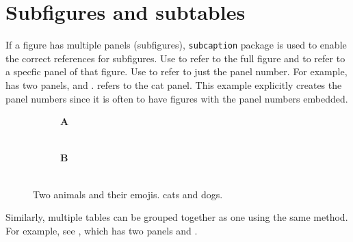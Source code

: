 \section{Subfigures and subtables}
If a figure has multiple panels (subfigures), \texttt{subcaption} package is used to enable the correct references for subfigures.
Use \cmd{\fref} to refer to the full figure and \cmd{\fref} to refer to a specfic panel of that figure.
Use \cmd{\subcaptionref} to refer to just the panel number.
For example,  has two panels,  and .
 refers to the cat panel.
This example explicitly creates the panel numbers since it is often to have figures with the panel numbers embedded.

\begin{figure}[t]
    \begin{subfigure}[b]{.5\linewidth}
        \centering
        \textbf{\sffamily A}\\[-0.5\onelineskip]
        \HUGE {}\\
    \end{subfigure}%
    \begin{subfigure}[b]{.5\linewidth}
        \centering
        \textbf{\sffamily B}\\[-0.5\onelineskip]
        \HUGE {}\\
    \end{subfigure}
    \caption[Two animals and their emojis.]{%
        Two animals and their emojis.
         cats and  dogs.
    }
    \label{fig:subfigure-demo}
\end{figure}

Similarly, multiple tables can be grouped together as one using the same method. For example, see , which has two panels  and .

